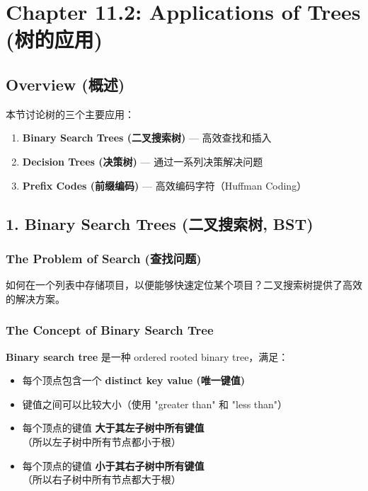\documentclass[10pt,a4paper,openany]{ctexbook}
\theoremstyle{definition}
\theoremstyle{remark}
\begin{document}
\newpage

\section{Chapter 11.2: Applications of Trees (树的应用)}

\vspace{-2pt}

\subsection{Overview (概述)}

本节讨论树的三个主要应用：
\begin{enumerate}
\item \textbf{Binary Search Trees (二叉搜索树)} — 高效查找和插入
\item \textbf{Decision Trees (决策树)} — 通过一系列决策解决问题
\item \textbf{Prefix Codes (前缀编码)} — 高效编码字符（Huffman Coding）

\end{enumerate}

\vspace{-2pt}

\subsection{1. Binary Search Trees (二叉搜索树, BST)}

\subsubsection{The Problem of Search (查找问题)}

如何在一个列表中存储项目，以便能够快速定位某个项目？二叉搜索树提供了高效的解决方案。
\subsubsection{The Concept of Binary Search Tree}

\textbf{Binary search tree} 是一种 ordered rooted binary tree，满足：
\begin{itemize}
\item 每个顶点包含一个 \textbf{distinct key value (唯一键值)}
\item 键值之间可以比较大小（使用 "greater than" 和 "less than"）
\item 每个顶点的键值 \textbf{大于其左子树中所有键值}（所以左子树中所有节点都小于根）
\item 每个顶点的键值 \textbf{小于其右子树中所有键值}（所以右子树中所有节点都大于根）

\end{itemize}
\end{document}
